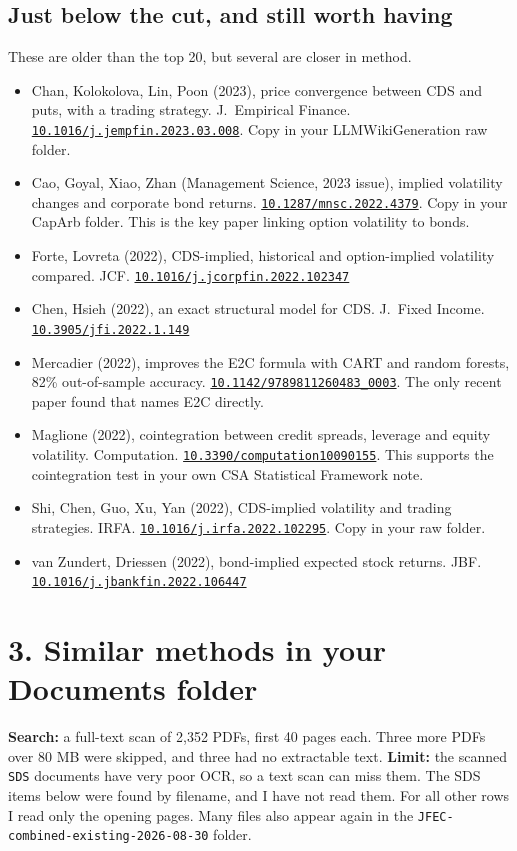 \documentclass[10pt,a4paper]{article}
\newcommand{\doi}[1]{\href{https://doi.org/#1}{\nolinkurl{#1}}}
\begin{document}
\subsection*{Just below the cut, and still worth having}
These are older than the top 20, but several are closer in method.
\begin{itemize}[leftmargin=*,itemsep=1pt]
\item Chan, Kolokolova, Lin, Poon (2023), price convergence between CDS and puts, with a trading strategy. J.\ Empirical Finance. \doi{10.1016/j.jempfin.2023.03.008}. Copy in your LLMWikiGeneration raw folder.
\item Cao, Goyal, Xiao, Zhan (Management Science, 2023 issue), implied volatility changes and corporate bond returns. \doi{10.1287/mnsc.2022.4379}. Copy in your CapArb folder. This is the key paper linking option volatility to bonds.
\item Forte, Lovreta (2022), CDS-implied, historical and option-implied volatility compared. JCF. \doi{10.1016/j.jcorpfin.2022.102347}
\item Chen, Hsieh (2022), an exact structural model for CDS. J.\ Fixed Income. \doi{10.3905/jfi.2022.1.149}
\item Mercadier (2022), improves the E2C formula with CART and random forests, 82\% out-of-sample accuracy. \doi{10.1142/9789811260483_0003}. The only recent paper found that names E2C directly.
\item Maglione (2022), cointegration between credit spreads, leverage and equity volatility. Computation. \doi{10.3390/computation10090155}. This supports the cointegration test in your own CSA Statistical Framework note.
\item Shi, Chen, Guo, Xu, Yan (2022), CDS-implied volatility and trading strategies. IRFA. \doi{10.1016/j.irfa.2022.102295}. Copy in your raw folder.
\item van Zundert, Driessen (2022), bond-implied expected stock returns. JBF. \doi{10.1016/j.jbankfin.2022.106447}
\end{itemize}

\section*{3. Similar methods in your Documents folder}
\textbf{Search:} a full-text scan of 2,352 PDFs, first 40 pages each. Three more PDFs over 80 MB were skipped, and three had no extractable text. \textbf{Limit:} the scanned \texttt{SDS} documents have very poor OCR, so a text scan can miss them. The SDS items below were found by filename, and I have not read them. For all other rows I read only the opening pages. Many files also appear again in the \texttt{JFEC-combined-existing-2026-08-30} folder.
\end{document}
